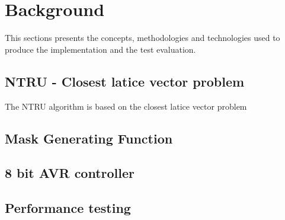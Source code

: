 \section{Background}

This sections presents the concepts, methodologies and technologies used to produce the implementation and the test evaluation.

\subsection{NTRU - Closest latice vector problem}

The NTRU algorithm is based on the closest latice vector problem
\subsection{Mask Generating Function}
\subsection{8 bit AVR controller}
\subsection{Performance testing}
